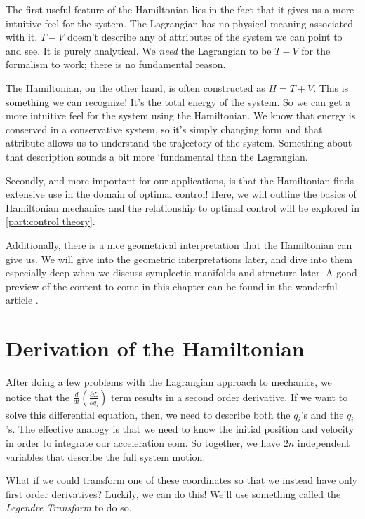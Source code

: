 The first useful feature of the \gls{Hamiltonian} lies in the fact that it gives us a more intuitive feel for the system. The \gls{Lagrangian} has no physical meaning associated with it. $T-V$ doesn't describe any of attributes of the system we can point to and see. It is purely analytical. We \textit{need} the \gls{Lagrangian} to be $T-V$ for the formalism to work; there is no fundamental reason.

The \gls{Hamiltonian}, on the other hand, is often constructed as $H=T+V$. This is something we can recognize! It's the total energy of the system. So we can get a more intuitive feel for the system using the Hamiltonian. We know that energy is conserved in a conservative system, so it's simply changing form and that attribute allows us to understand the trajectory of the system. Something about that description sounds a bit more `fundamental than the \gls{Lagrangian}.

Secondly, and more important for our applications, is that the \gls{Hamiltonian} finds extensive use in the domain of optimal control! Here, we will outline the basics of \gls{Hamiltonian} mechanics and the relationship to optimal control will be explored in \autoref{part:control theory}.

Additionally, there is a nice geometrical interpretation that the \gls{Hamiltonian} can give us. We will give into the geometric interpretations later, and dive into them especially deep when we discuss symplectic manifolds and structure later. A good preview of the content to come in this chapter can be found in the wonderful article \cite{hirvonen_hamiltonian_nodate}.

\section{Derivation of the Hamiltonian}

After doing a few problems with the \gls{Lagrangian} approach to mechanics, we notice that the $\frac{d}{dt}\left(\frac{\partial L}{\partial \dot{q}_i}\right)$ term results in a second order derivative. If we want to solve this differential equation, then, we need to describe both the $q_i$'s and the $\dot{q}_i$'s. The effective analogy is that we need to know the initial position and velocity in order to integrate our acceleration \gls{eom}. So together, we have $2n$ independent variables that describe the full system motion.

What if we could transform one of these coordinates so that we instead have only first order derivatives? Luckily, we can do this! We'll use something called the \textit{Legendre Transform} to do so.

